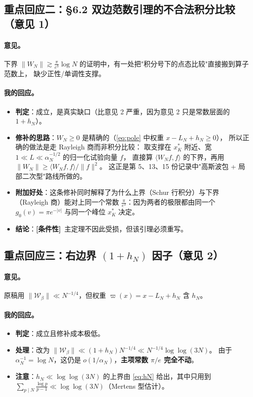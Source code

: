 \documentclass[11pt,a4paper]{ctexart}
\newcommand{\al}{\alpha_{N}}
\newcommand{\be}{\beta}
\newcommand{\LN}{L_{N}}
\newcommand{\COND}{\textcolor{orange!85!black}{\textbf{[条件性]}}}
\begin{document}
\subsection{重点回应二：§6.2 双边范数引理的不合法积分比较（意见 1）}

\paragraph{意见。}
下界 $\|W_N\|\gtrsim\frac{\pi}{e^3}\log N$ 的证明中，有一处把"积分号下的点态比较"直接搬到算子范数上，
缺少正性/单调性支撑。

\paragraph{我的回应。}
\begin{itemize}
\item \textbf{判定}：成立，是真实缺口（比意见 2 严重，因为意见 2 只是常数层面的 $1+h_N$）。
\item \textbf{修补的思路}：$W_N\ge0$ 是精确的（\eqref{eq:pole} 中权重 $x-\LN+h_N\ge0$），
所以正确的做法是走 Rayleigh 商而非积分比较：
取支撑在 $x^*_K$ 附近、宽 $1\ll L\ll\al^{-1/2}$ 的归一化试验向量 $f$，
直接算 $\langle W_Nf,f\rangle$ 的下界，再用 $\|W_N\|\ge\langle W_Nf,f\rangle/\|f\|^2$。
这正是第 5、13、15 份记录中"高斯波包 + 局部二次型"路线所做的。
\item \textbf{附加好处}：这条修补同时解释了为什么上界（Schur 行积分）与下界（Rayleigh 商）能对上同一个常数
$\frac{\pi}{e^3}$：因为两者的极限都由同一个 $g_0(v)=\pi e^{-|v|}$ 与同一个峰位 $x^*_K$ 决定。
\item \textbf{结论}：\COND\ 主定理不因此受损，但该引理必须重写。
\end{itemize}

\subsection{重点回应三：右边界 $(1+h_N)$ 因子（意见 2）}

\paragraph{意见。}
原稿用 $\|\mathcal W_{\be}\|\ll N^{-1/4}$，但权重 $\varpi(x)=x-\LN+h_N$ 含 $h_N$。

\paragraph{我的回应。}
\begin{itemize}
\item \textbf{判定}：成立且修补成本极低。
\item \textbf{处理}：改为 $\|\mathcal W_{\be}\|\ll(1+h_N)N^{-1/4}\ll N^{-1/4}\log\log(3N)$。
由于 $\al^{-1}=\log N$，这仍是 $o(1/\al)$，\textbf{主项常数 $\pi/e$ 完全不动}。
\item \textbf{注意}：$h_N\ll\log\log(3N)$ 的上界由 \eqref{eq:hN} 给出，其中只用到 $\sum_{p\mid N}\frac{\log p}{p-1}\ll\log\log(3N)$（Mertens 型估计）。
\end{itemize}
\end{document}
